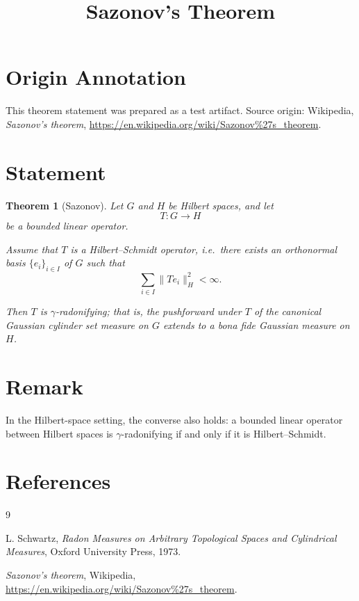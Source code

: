 \documentclass[11pt]{article}
\title{Sazonov's Theorem}
\author{}
\date{}
\newtheorem{theorem}{Theorem}
\begin{document}
\maketitle

\section*{Origin Annotation}
This theorem statement was prepared as a test artifact.
Source origin: Wikipedia, \emph{Sazonov's theorem},
\url{https://en.wikipedia.org/wiki/Sazonov\%27s_theorem}.

\section*{Statement}

\begin{theorem}[Sazonov]
Let $G$ and $H$ be Hilbert spaces, and let
\[
T : G \to H
\]
be a bounded linear operator.

Assume that $T$ is a Hilbert--Schmidt operator, i.e.\ there exists an
orthonormal basis $\{e_i\}_{i\in I}$ of $G$ such that
\[
\sum_{i\in I} \|T e_i\|_H^2 < \infty.
\]

Then $T$ is $\gamma$-radonifying; that is, the pushforward under $T$ of the
canonical Gaussian cylinder set measure on $G$ extends to a bona fide
Gaussian measure on $H$.
\end{theorem}

\section*{Remark}

In the Hilbert-space setting, the converse also holds: a bounded linear
operator between Hilbert spaces is $\gamma$-radonifying if and only if it is
Hilbert--Schmidt.

\section*{References}

\begin{thebibliography}{9}

L. Schwartz,
\textit{Radon Measures on Arbitrary Topological Spaces and Cylindrical Measures},
Oxford University Press, 1973.

\textit{Sazonov's theorem},
Wikipedia,
\url{https://en.wikipedia.org/wiki/Sazonov\%27s_theorem}.

\end{thebibliography}
\end{document}

